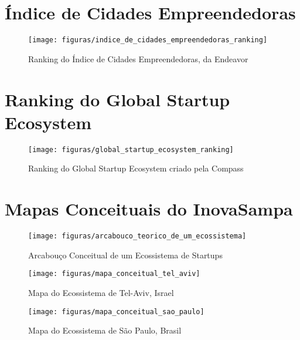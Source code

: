 \begin{anexosenv}

\partanexos

\chapter{Índice de Cidades Empreendedoras}
\label{anexo:indice_de_cidades_empreendedoras}

\begin{figure}[!htb]
\centering
\texttt{[image: figuras/indice\_de\_cidades\_empreendedoras\_ranking]}
\caption{Ranking do Índice de Cidades Empreendedoras, da Endeavor}
\label{figure:indice_de_cidades_empreendedoras_ranking}
\end{figure}

\chapter{Ranking do Global Startup Ecosystem}
\label{anexo:ranking_do_global_startup_ecosystem}

\begin{figure}[!htb]
\centering
\texttt{[image: figuras/global\_startup\_ecosystem\_ranking]}
\caption{Ranking do Global Startup Ecosystem criado pela Compass}
\label{figure:global_startup_ecosystem_ranking}
\end{figure}

\chapter{Mapas Conceituais do InovaSampa}
\label{anexo:mapas_concentuais_do_inovasampa}

\begin{figure}[!htb]
	\centering
	\texttt{[image: figuras/arcabouco\_teorico\_de\_um\_ecossistema]}
	\caption{Arcabouço Conceitual de um Ecossistema de Startups}
	\label{figure:arcabouco_teorico_de_um_ecossistema}
\end{figure}

\begin{figure}[!htbp]
	\centering
	\texttt{[image: figuras/mapa\_conceitual\_tel\_aviv]}
	\caption{Mapa do Ecossistema de Tel-Aviv, Israel}
	\label{figure:mapa_conceitual_tel_aviv}
\end{figure}

\begin{figure}[!htbp]
	\centering
	\texttt{[image: figuras/mapa\_conceitual\_sao\_paulo]}
	\caption{Mapa do Ecossistema de São Paulo, Brasil}
	\label{figure:mapa_conceitual_sao_paulo}
\end{figure}

\end{anexosenv}


